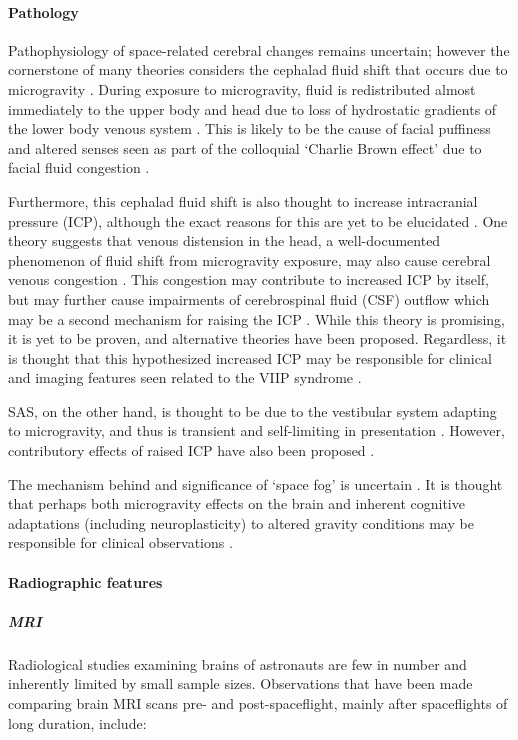 \paragraph{Pathology}

Pathophysiology of space-related cerebral changes remains uncertain; however the cornerstone of many theories considers the cephalad fluid shift that occurs due to microgravity . During exposure to microgravity, fluid is redistributed almost immediately to the upper body and head due to loss of hydrostatic gradients of the lower body venous system . This is likely to be the cause of facial puffiness and altered senses seen as part of the colloquial `Charlie Brown effect' due to facial fluid congestion .

Furthermore, this cephalad fluid shift is also thought to increase intracranial pressure (ICP), although the exact reasons for this are yet to be elucidated . One theory suggests that venous distension in the head, a well-documented phenomenon of fluid shift from microgravity exposure, may also cause cerebral venous congestion . This congestion may contribute to increased ICP by itself, but may further cause impairments of cerebrospinal fluid (CSF) outflow which may be a second mechanism for raising the ICP . While this theory is promising, it is yet to be proven, and alternative theories have been proposed. Regardless, it is thought that this hypothesized increased ICP may be responsible for clinical and imaging features seen related to the VIIP syndrome .

SAS, on the other hand, is thought to be due to the vestibular system adapting to microgravity, and thus is transient and self-limiting in presentation . However, contributory effects of raised ICP have also been proposed .

The mechanism behind and significance of `space fog' is uncertain . It is thought that perhaps both microgravity effects on the brain and inherent cognitive adaptations (including neuroplasticity) to altered gravity conditions may be responsible for clinical observations .

\paragraph{Radiographic features}

\subparagraph{MRI}

Radiological studies examining brains of astronauts are few in number and inherently limited by small sample sizes. Observations that have been made comparing brain MRI scans pre- and post-spaceflight, mainly after spaceflights of long duration, include:

